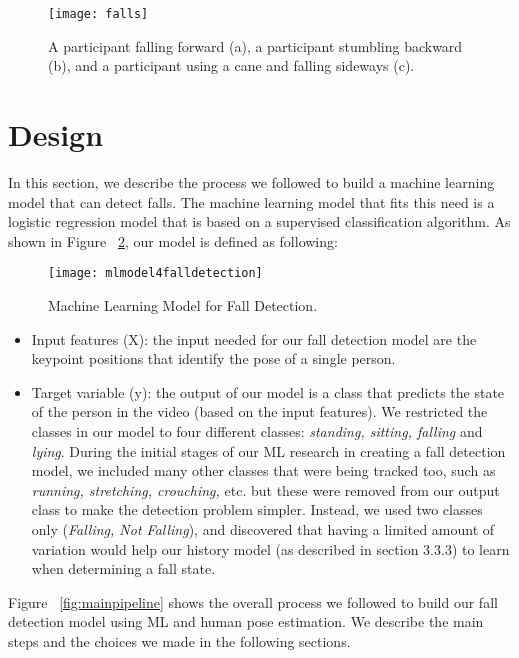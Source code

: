 \begin{figure}
  \texttt{[image: falls]}
  \caption{A participant falling forward (a), a participant stumbling backward (b), and a participant using a cane and falling sideways (c).}
  \label{fig:falls}
\end{figure}


\section{Design}

In this section, we describe the process we followed to build a machine learning model that can detect falls. The machine learning model that fits this need is a logistic regression model that is based on a supervised classification algorithm. As shown in Figure ~\ref{fig:mlmodel4falldetection}, our model is defined as following:


\begin{figure}
  \texttt{[image: mlmodel4falldetection]}
  \caption{Machine Learning Model for Fall Detection.}
  \label{fig:mlmodel4falldetection}
\end{figure}

 \begin{itemize}
        \item Input features (X): the input needed for our fall detection model are the keypoint positions that identify the pose of a single person.
        \item Target variable (y): the output of our model is a class that predicts the state of the person in the video (based on the input features). We restricted the classes in our model to four different classes: \textit{standing, sitting, falling} and \textit{lying}. During the initial stages of our ML research in creating a fall detection model, we included many other classes that were being tracked too, such as \textit{running, stretching, crouching,} etc. but these were removed from our output class to make the detection problem simpler. Instead, we used two classes only (\textit{Falling, Not Falling}), and discovered that having a limited amount of variation would help our history model (as described in section 3.3.3) to learn when determining a fall state.

\end{itemize}


Figure ~\ref{fig:mainpipeline} shows the overall process we followed to build our fall detection model using ML and human pose estimation. We describe the main steps and the choices we made in the following sections.

